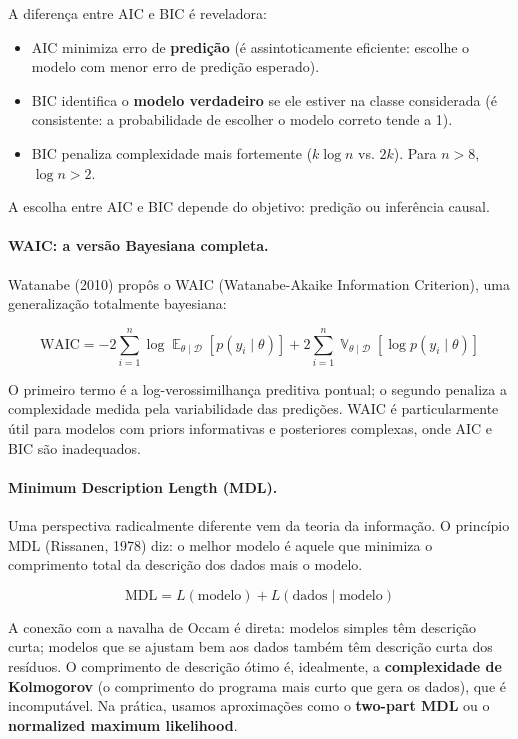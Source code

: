 \documentclass{tufte-handout}
\DeclareMathOperator{\E}{\mathbb{E}}
\DeclareMathOperator{\Var}{\mathbb{V}}
\begin{document}
\begin{remark}
    A diferença entre AIC e BIC é reveladora:
    \begin{itemize}
        \item AIC minimiza erro de \textbf{predição} (é assintoticamente eficiente: escolhe o modelo com menor erro de predição esperado).
        \item BIC identifica o \textbf{modelo verdadeiro} se ele estiver na classe considerada (é consistente: a probabilidade de escolher o modelo correto tende a 1).
        \item BIC penaliza complexidade mais fortemente ($k\log n$ vs. $2k$). Para $n > 8$, $\log n > 2$.
    \end{itemize}
    A escolha entre AIC e BIC depende do objetivo: predição ou inferência causal.
\end{remark}

\paragraph{WAIC: a versão Bayesiana completa.}

Watanabe (2010) propôs o WAIC (Watanabe-Akaike Information Criterion), uma generalização totalmente bayesiana:

\[
\text{WAIC} = -2 \sum_{i=1}^n \log \E_{\theta \mid \mathcal{D}}[p(y_i \mid \theta)] + 2 \sum_{i=1}^n \Var_{\theta \mid \mathcal{D}}[\log p(y_i \mid \theta)]
\]

O primeiro termo é a log-verossimilhança preditiva pontual; o segundo penaliza a complexidade medida pela variabilidade das predições. WAIC é particularmente útil para modelos com priors informativas e posteriores complexas, onde AIC e BIC são inadequados.

\paragraph{Minimum Description Length (MDL).}

Uma perspectiva radicalmente diferente vem da teoria da informação. O princípio MDL (Rissanen, 1978) diz: o melhor modelo é aquele que minimiza o comprimento total da descrição dos dados mais o modelo.

\[
\text{MDL} = L(\text{modelo}) + L(\text{dados} \mid \text{modelo})
\]

A conexão com a navalha de Occam é direta: modelos simples têm descrição curta; modelos que se ajustam bem aos dados também têm descrição curta dos resíduos. O comprimento de descrição ótimo é, idealmente, a \textbf{complexidade de Kolmogorov} (o comprimento do programa mais curto que gera os dados), que é incomputável. Na prática, usamos aproximações como o \textbf{two-part MDL} ou o \textbf{normalized maximum likelihood}.
\end{document}
